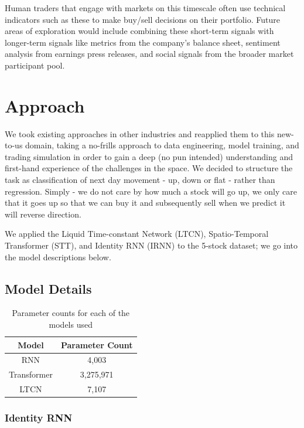 \documentclass[10pt,twocolumn,letterpaper]{article}
\begin{document}
Human traders that engage with markets on this timescale often use technical indicators such as these to make buy/sell decisions on their portfolio\cite{stock_charts}. Future areas of exploration would include combining these short-term signals with longer-term signals like metrics from the company’s balance sheet, sentiment analysis from earnings press releases, and social signals from the broader market participant pool.

    \section{Approach}
We took existing approaches in other industries and reapplied them to this new-to-us domain, taking a no-frills approach to data engineering, model training, and trading simulation in order to gain a deep (no pun intended) understanding and first-hand experience of the challenges in the space. We decided to structure the task as classification of next day movement - up, down or flat - rather than regression. Simply - we do not care by how much a stock will go up, we only care that it goes up so that we can buy it and subsequently sell when we predict it will reverse direction.

We applied the  Liquid Time-constant Network (LTCN), Spatio-Temporal Transformer (STT), and Identity RNN (IRNN) to the 5-stock dataset; we go into the model descriptions below.

    \subsection{Model Details}

\begin{table}
\begin{center}
    \begin{tabular}{|c|c|}
\hline
        Model & Parameter Count \\
\hline
        RNN & 4,003 \\
\hline
        Transformer & 3,275,971 \\
\hline
        LTCN & 7,107 \\
\hline
\end{tabular}
\end{center}
    \caption{Parameter counts for each of the models used}
\label{tab:parametercounts}
\end{table}

    \subsubsection{Identity RNN}
\end{document}
